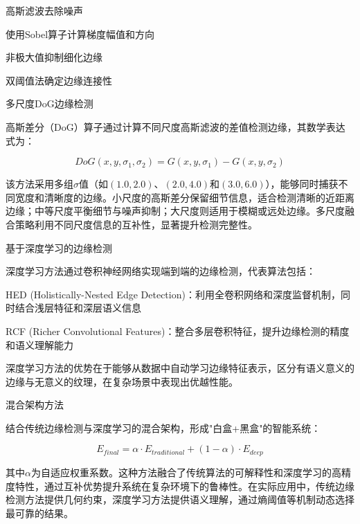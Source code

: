 \documentclass[a4paper, UTF8, fontsize=12pt]{ctexart} %
\numberwithin{equation}{section} %
\begin{document}
\begin{parlist}
\begin{circledlist}
\item 高斯滤波去除噪声
\item 使用Sobel算子计算梯度幅值和方向
\item 非极大值抑制细化边缘
\item 双阈值法确定边缘连接性
\end{circledlist}

\item 多尺度DoG边缘检测

高斯差分（DoG）算子通过计算不同尺度高斯滤波的差值检测边缘，其数学表达式为：

\begin{equation}
DoG(x,y,\sigma_1,\sigma_2) = G(x,y,\sigma_1) - G(x,y,\sigma_2)
\end{equation}

该方法采用多组$\sigma$值（如$(1.0,2.0)$、$(2.0,4.0)$和$(3.0,6.0)$），能够同时捕获不同宽度和清晰度的边缘。小尺度的高斯差分保留细节信息，适合检测清晰的近距离边缘；中等尺度平衡细节与噪声抑制；大尺度则适用于模糊或远处边缘。多尺度融合策略利用不同尺度信息的互补性，显著提升检测完整性。

\item 基于深度学习的边缘检测

深度学习方法通过卷积神经网络实现端到端的边缘检测，代表算法包括：

\begin{circledlist}
\item HED (Holistically-Nested Edge Detection)：利用全卷积网络和深度监督机制，同时结合浅层特征和深层语义信息
\item RCF (Richer Convolutional Features)：整合多层卷积特征，提升边缘检测的精度和语义理解能力
\end{circledlist}

深度学习方法的优势在于能够从数据中自动学习边缘特征表示，区分有语义意义的边缘与无意义的纹理，在复杂场景中表现出优越性能。

\item 混合架构方法

结合传统边缘检测与深度学习的混合架构，形成"白盒+黑盒"的智能系统：

\begin{equation}
E_{final} = \alpha \cdot E_{traditional} + (1-\alpha) \cdot E_{deep}
\end{equation}

其中$\alpha$为自适应权重系数。这种方法融合了传统算法的可解释性和深度学习的高精度特性，通过互补优势提升系统在复杂环境下的鲁棒性。在实际应用中，传统边缘检测方法提供几何约束，深度学习方法提供语义理解，通过熵阈值等机制动态选择最可靠的结果。
\end{parlist}
\end{document}
